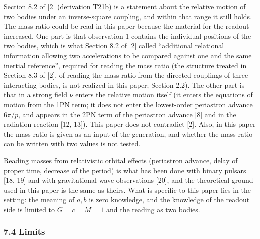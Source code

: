\documentclass[
  a4paper,
]{article}
\begin{document}
Section 8.2 of {[}2{]} (derivation T21b) is a statement about the
relative motion of two bodies under an inverse-square coupling, and
within that range it still holds. The mass ratio could be read in this
paper because the material for the readout increased. One part is that
observation 1 contains the individual positions of the two bodies, which
is what Section 8.2 of {[}2{]} called ``additional relational
information allowing two accelerations to be compared against one and
the same inertial reference'', required for reading the mass ratio (the
structure treated in Section 8.3 of {[}2{]}, of reading the mass ratio
from the directed couplings of three interacting bodies, is not realized
in this paper; Section 2.2). The other part is that in a strong field
\(\nu\) enters the relative motion itself (it enters the equations of
motion from the 1PN term; it does not enter the lowest-order periastron
advance \(6\pi/p\), and appears in the 2PN term of the periastron
advance {[}8{]} and in the radiation reaction {[}12, 13{]}). This paper
does not contradict {[}2{]}. Also, in this paper the mass ratio is given
as an input of the generation, and whether the mass ratio can be written
with two values is not tested.

Reading masses from relativistic orbital effects (periastron advance,
delay of proper time, decrease of the period) is what has been done with
binary pulsars {[}18, 19{]} and with gravitational-wave observations
{[}20{]}, and the theoretical ground used in this paper is the same as
theirs. What is specific to this paper lies in the setting: the meaning
of \(a, b\) is zero knowledge, and the knowledge of the readout side is
limited to \(G=c=M=1\) and the reading as two bodies.

\subsubsection{7.4 Limits}\label{limits}
\end{document}
